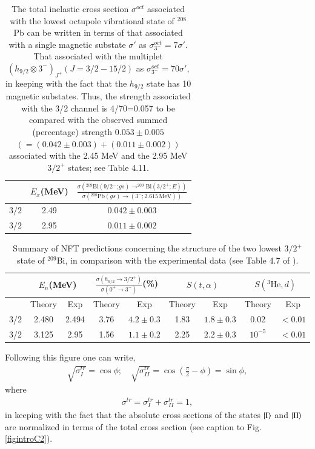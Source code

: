 \begin{table}
\begin{tabular}{|c|c|c|}
\hline 
 & $E_x$(MeV) & $\frac{\sigma\left(^{209}\text{Bi}(9/2^-;gs)\rightarrow^{209}\text{Bi}(3/2^+;E)\right)}{\sigma\left(^{208}\text{Pb}(gs)\rightarrow (3^-;2.615\, \text{MeV})\right)}$  \\
 \hline 
$3/2$ & 2.49 & $0.042\pm0.003$   \\ 
$3/2$ & 2.95 & $0.011\pm0.002$  \\ 
 \hline
\end{tabular}\caption{The total inelastic cross section $\sigma^{oct}$ associated with the lowest octupole vibrational state of $^{208}$Pb can be written in terms of that associated with a single magnetic substate $\sigma'$ as $\sigma_{3^-}^{oct}=7\sigma'$. That associated with the multiplet $(h_{9/2}\otimes 3^-)_{J^+} (J=3/2-15/2)$ as $\sigma_{3^-}^{oct}=70\sigma'$, in keeping with the fact that the $h_{9/2}$ state has 10 magnetic substates. Thus, the strength associated with the 3/2 channel is 4/70=0.057 to be compared with the observed summed (percentage) strength $0.053\pm0.005 $ $(=(0.042\pm0.003)+(0.011\pm0.002))$ associated with the 2.45 MeV and the 2.95 MeV $3/2^+$ states; see \cite{Bortignon:77} Table 4.11.}\label{tabintroC2}
\end{table}
\begin{table}
\begin{tabular}{|c|c|c|c|c|c|c|c|c|}
\hline
& \multicolumn{2}{|c}{$E_n$(MeV)} & \multicolumn{2}{|c}{$\frac{\sigma(h_{9/2}\rightarrow 3/2^+)}{\sigma(0^+\rightarrow 3^-)}$(\%)} & \multicolumn{2}{|c}{$S(t,\alpha)$}  & \multicolumn{2}{|c|}{$S(^3\text{He},d)$}   \\
\hline
&Theory  & Exp  & Theory  & Exp & Theory & Exp & Theory  & Exp  \\
\hline
3/2& 2.480 & 2.494  & 3.76  & $4.2\pm0.3$  & 1.83  & $1.8\pm0.3$ &0.02  & $<0.01$  \\
3/2& 3.125 & 2.95  & 1.56 & $1.1\pm0.2$  & 2.25  & $2.2\pm0.3$ & $10^{-5}$  & $<0.01$  \\
\hline
\end{tabular}\caption{Summary of NFT predictions concerning the structure of the two lowest $3/2^+$ state of $^{209}$Bi, in comparison with the experimental data (see Table 4.7 of \cite{Bortignon:77}).}\label{tabintroC3}
\end{table}
Following this figure  one can write,
\begin{align}
\sqrt{\sigma_I^{tr}}=\cos\phi;\quad \sqrt{\sigma_{II}^{tr}}=\cos\left(\frac{\pi}{2}-\phi\right)=\sin \phi,
\end{align}
where
\begin{align}
{\sigma^{tr}}={\sigma_I^{tr}}+{\sigma_{II}^{tr}}=1,
\end{align}
in keeping with the fact that the absolute cross sections of the states $|{\text{I}} \rangle$ and $|{\text{II}} \rangle$ are normalized in terms of the total cross section (see caption to Fig. \ref{figintroC2}).


